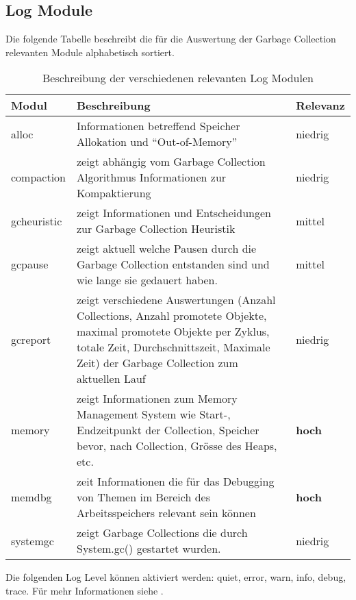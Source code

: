 \subsection{Log Module}\label{logmodule}

Die folgende Tabelle beschreibt die für die Auswertung der Garbage Collection relevanten Module alphabetisch sortiert. 

\begin{longtable}{|p{4cm}|p{9cm}|p{2cm}|}
    \caption{Beschreibung der verschiedenen relevanten Log Modulen}\\\hline
  \textbf{Modul} & \textbf{Beschreibung} & \textbf{Relevanz}\\\hline
  alloc & Informationen betreffend Speicher Allokation und ``Out-of-Memory'' & niedrig \\\hline
  compaction & zeigt abhängig vom Garbage Collection Algorithmus Informationen zur Kompaktierung& niedrig \\\hline
  gcheuristic & zeigt Informationen und Entscheidungen zur Garbage Collection Heuristik & mittel \\\hline
  gcpause & zeigt aktuell welche Pausen durch die Garbage Collection entstanden sind und wie lange sie gedauert haben. & mittel \\\hline
  gcreport & zeigt verschiedene Auswertungen (Anzahl Collections, Anzahl promotete Objekte, maximal promotete Objekte per Zyklus, totale Zeit, Durchschnittszeit, Maximale Zeit) der Garbage Collection zum aktuellen Lauf& niedrig \\\hline
  memory & zeigt Informationen zum Memory Management System wie Start-, Endzeitpunkt der Collection, Speicher bevor, nach Collection, Grösse des Heaps, etc.& \textbf{hoch} \\\hline
  memdbg & zeit Informationen die für das Debugging von Themen im Bereich des Arbeitsspeichers relevant sein können& \textbf{hoch} \\\hline
  systemgc & zeigt Garbage Collections die durch System.gc() gestartet wurden. & niedrig \\\hline
\end{longtable}

Die folgenden Log Level können aktiviert werden: quiet, error, warn, info, debug, trace. Für mehr Informationen siehe \cite{oracleJRockitR28CLR}.
